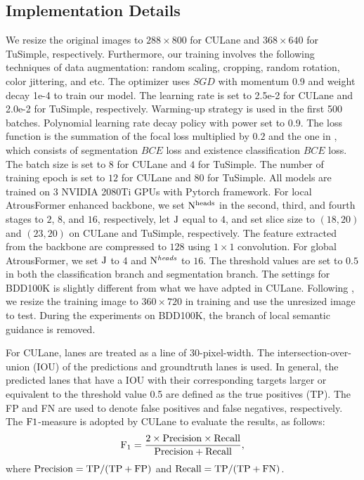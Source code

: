 \documentclass[preprint,12pt,review]{elsarticle}
\begin{document}
\subsection{Implementation Details}
We resize the original images to $288\times 800$ for CULane and $368\times 640$ for TuSimple, respectively. Furthermore, our training involves the following techniques of data augmentation: random scaling, cropping, random rotation, color jittering, and etc.
The optimizer uses $SGD$ with momentum 0.9 and weight decay 1e-4 to train our model. The learning rate is set to 2.5e-2 for CULane and 2.0e-2 for TuSimple, respectively. Warming-up strategy is used in the first 500 batches. Polynomial learning rate decay policy with power set to 0.9. The loss function is the summation of the focal loss multiplied by $0.2$ and the one in \cite{SCNN,resa}, which consists of segmentation $BCE$ loss and existence classification $BCE$ loss. The batch size is set to $8$ for CULane and $4$ for TuSimple. The number of training epoch is set to $12$ for CULane and 80 for TuSimple. All models are trained on 3 NVIDIA 2080Ti GPUs with Pytorch framework. For local AtrousFormer enhanced backbone, we set $\rm{N}^{heads}$ in the second, third, and fourth stages to $2$, $8$, and $16$, respectively, let $\rm{J}$ equal to $4$, and set slice size to $(18,20)$ and $(23, 20)$ on CULane and TuSimple, respectively. The feature extracted from the backbone are compressed to $128$ using $1\times 1$ convolution. For global AtrousFormer, we set $\rm{J}$ to 4 and $\rm{N}^{\it{heads}}$ to $16$. The threshold values are set to $0.5$ in both the classification branch and segmentation branch. The settings for BDD100K is slightly different from what we have adpted in CULane. Following \cite{distillation}, we resize the training image to $360\times 720$ in training and use the unresized image to test. During the experiments on BDD100K, the branch of local semantic guidance is removed.

For CULane, lanes are treated as a line of 30-pixel-width. The intersection-over-union (IOU) of the predictions and groundtruth lanes is used. In general, the predicted lanes that have a IOU with their corresponding targets larger or equivalent to the threshold value 0.5 are defined as the true positives (TP). The FP and FN are used to denote false positives and false negatives, respectively. The $\rm F1$-measure is adopted by CULane to evaluate the results, as follows:
\begin{equation}
	\rm{F}_{1} = \frac{2\times Precision \times Recall}{Precision + Recall},
\end{equation}
where $\rm Precision=TP/(TP+FP)$ and $\rm Recall=TP/(TP+FN)$.
\end{document}
